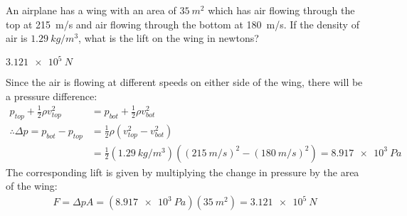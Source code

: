 \question An airplane has a wing with an area of $\SI{35}{m^2}$ which has air flowing through the top at \SI{215}{m/s} and air flowing through the bottom at \SI{180}{m/s}. If the density of air is $\SI{1.29}{kg/m^3}$, what is the lift on the wing in newtons?
\begin{finalanswer}
	$\SI{3.121e5}{N}$
\end{finalanswer}
\begin{solution}
	Since the air is flowing at different speeds on either side of the wing, there will be a pressure difference:
	\begin{align*}
	p_{top} + \frac{1}{2}\rho v_{top}^2 &= p_{bot} + \frac{1}{2}\rho v_{bot}^2\\
	\therefore \Delta p = p_{bot}-p_{top} &=\frac{1}{2}\rho (v_{top}^2-v_{bot}^2)\\
	&=\frac{1}{2}(\SI{1.29}{kg/m^3}) ((\SI{215}{m/s})^2-(\SI{180}{m/s})^2) = \SI{8.917e3}{Pa}
	\end{align*}
	The corresponding lift is given by multiplying the change in pressure by the area of the wing:
	\begin{align*}
	F=\Delta p A = (\SI{8.917e3}{Pa})(\SI{35}{m^2})=\SI{3.121e5}{N}
	\end{align*}
\end{solution}

